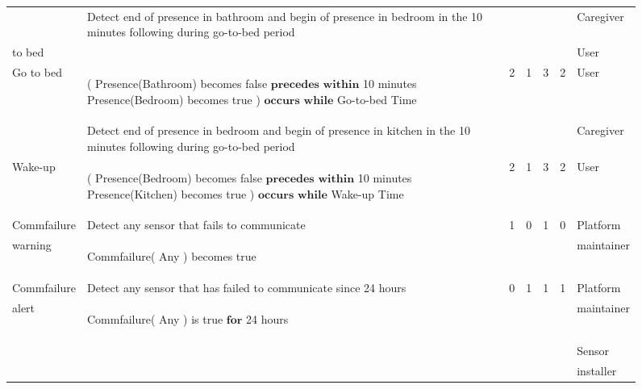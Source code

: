 \begin{figure*}[h]
\begin{tabular}{|p{1.45cm}|p{8cm}|c|c|c|c|p{1.65cm}|}
    \hline
    &\cellcolor{gray!15} Detect end of presence in bathroom and begin of presence in bedroom in the 10 minutes following during go-to-bed period & & & & &Caregiver \\ %
    to bed  &\cellcolor{gray!15}  & & & & &User \\ 
     Go to bed&  \begin{mtext} 
      ( Presence(Bathroom) becomes false $\textbf{precedes}$ $\textbf{within}$ 10 minutes Presence(Bedroom) becomes true ) $\textbf{occurs}$ $\textbf{while}$ Go-to-bed Time
    \end{mtext} & 2& 1& 3& 2& User\\
    \hline
     &\cellcolor{gray!15} Detect end of presence in bedroom and begin of presence in kitchen in the 10 minutes following during go-to-bed period & & & &  & Caregiver \\ %
    Wake-up& \begin{mtext} 
      ( Presence(Bedroom) becomes false $\textbf{precedes}$ $\textbf{within}$ 10 minutes Presence(Kitchen) becomes true ) $\textbf{occurs}$ $\textbf{while}$ Wake-up Time
    \end{mtext}&2 &1 &3 &2&User \\
    \hline
    Commfailure &\cellcolor{gray!15} Detect any sensor that fails to communicate & \multirow{2}{*}{1} & \multirow{2}{*}{0} & \multirow{2}{*}{1} & \multirow{2}{*}{0} & Platform \\%
      warning& \begin{mtext}  
        Commfailure( Any ) becomes true 
        \end{mtext}& & & && maintainer \\
    \hline
    Commfailure &\cellcolor{gray!15} Detect any sensor that has failed to communicate since 24 hours & \multirow{4}{*}{0} & \multirow{4}{*}{1} & \multirow{4}{*}{1} & \multirow{4}{*}{1} & Platform\\ %
      alert&  \begin{mtext} 
        Commfailure( Any ) is true $\textbf{for}$ 24 hours 
        \end{mtext}& & & &&  maintainer \\
                                  & & & & && Sensor \\
                                  & & & & && installer \\

\end{tabular}
\end{figure*}

